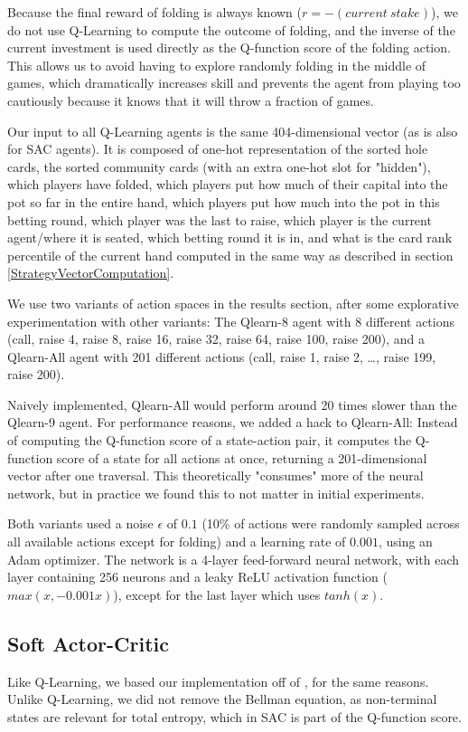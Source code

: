 Because the final reward of folding is always known ($r = -(current\ stake)$), we do not use Q-Learning to compute the outcome of folding, and the inverse of the current investment is used directly as the Q-function score of the folding action. This allows us to avoid having to explore randomly folding in the middle of games, which dramatically increases skill and prevents the agent from playing too cautiously because it knows that it will throw a fraction of games.

Our input to all Q-Learning agents is the same 404-dimensional vector  (as is also for SAC agents). It is composed of one-hot representation of the sorted hole cards, the sorted community cards (with an extra one-hot slot for "hidden"), which players have folded, which players put how much of their capital into the pot so far in the entire hand, which players put how much into the pot in this betting round, which player was the last to raise, which player is the current agent/where it is seated, which betting round it is in, and what is the card rank percentile of the current hand computed in the same way as described in section \ref{StrategyVectorComputation}.

We use two variants of action spaces in the results section, after some explorative experimentation with other variants: The Qlearn-8 agent with 8 different actions (call, raise 4, raise 8, raise 16, raise 32, raise 64, raise 100, raise 200), and a Qlearn-All agent with 201 different actions (call, raise 1, raise 2, \dots, raise 199, raise 200).

Naively implemented, Qlearn-All would perform around 20 times slower than the Qlearn-9 agent. For performance reasons, we added a hack to Qlearn-All: Instead of computing the Q-function score of a state-action pair, it computes the Q-function score of a state for all actions at once, returning a 201-dimensional vector after one traversal. This theoretically "consumes" more of the neural network, but in practice we found this to not matter in initial experiments.

Both variants used a noise $\epsilon$ of $0.1$ (10\% of actions were randomly sampled across all available actions except for folding) and a learning rate of $0.001$, using an Adam optimizer. The network is a 4-layer feed-forward neural network, with each layer containing 256 neurons and a leaky ReLU activation function ($max(x, -0.001x)$), except for the last layer which uses $tanh(x)$.

\subsection{Soft Actor-Critic}
Like Q-Learning, we based our implementation off of \cite{SpinningUp2018}, for the same reasons. Unlike Q-Learning, we did not remove the Bellman equation, as non-terminal states are relevant for total entropy, which in SAC is part of the Q-function score.

